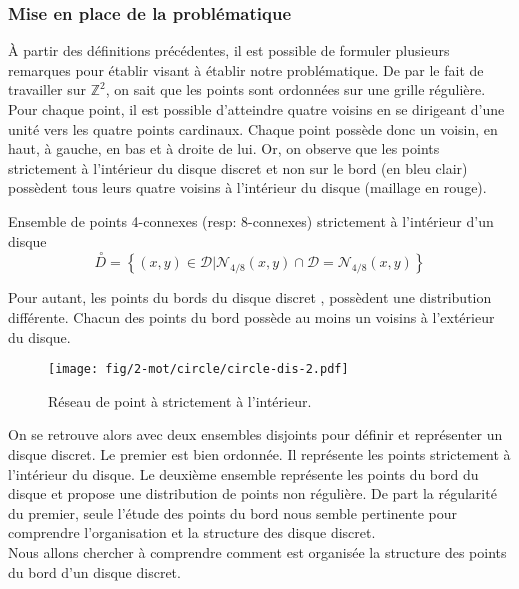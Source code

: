 \subsubsection{Mise en place de la problématique}

À partir des définitions précédentes, il est possible de formuler plusieurs remarques pour établir visant à établir notre problématique. De par le fait de travailler sur $\mathbb{Z}^{2}$, on sait que les points sont ordonnées sur une grille régulière. Pour chaque point, il est possible d'atteindre quatre voisins en se dirigeant d'une unité vers les quatre points cardinaux. Chaque point possède donc un voisin, en haut, à gauche, en bas et à droite de lui. Or, on observe que les points strictement à l'intérieur du disque discret et non sur le bord (en bleu clair) possèdent tous leurs quatre voisins à l'intérieur du disque (maillage en rouge).

\begin{Definition}{Ensemble de points 4-connexes (resp: 8-connexes) strictement à l'intérieur d'un disque}
\label{def:int-ens}
  $$ \stackrel{\ \circ}{D} =  \left\{ (x,y) \in \mathcal{D} | \mathcal{N}_{4/8}(x,y) \cap \mathcal{D} = \mathcal{N}_{4/8}(x,y) \right\}$$
\end{Definition}

Pour autant, les points du bords du disque discret , possèdent une distribution différente. Chacun des points du bord possède au moins un voisins à l'extérieur du disque.

\begin{figure}[H]
  \centering
  \texttt{[image: fig/2-mot/circle/circle-dis-2.pdf]}
  \caption{Réseau de point à strictement à l'intérieur.}
\end{figure}

On se retrouve alors avec deux ensembles disjoints pour définir et représenter un disque discret. Le premier est bien ordonnée. Il représente les points strictement à l'intérieur du disque. Le deuxième ensemble représente les points du bord du disque et propose une distribution de points non régulière. De part la régularité du premier, seule l'étude des points du bord nous semble pertinente pour comprendre l'organisation et la structure des disque discret.\\

Nous allons chercher à comprendre comment est organisée la structure des points du bord d'un disque discret.


